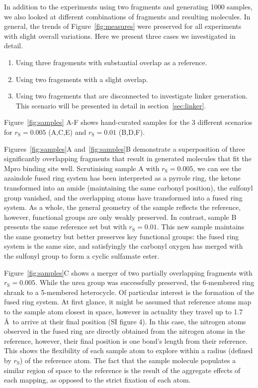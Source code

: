 \documentclass[journal=jacsat,manuscript=article]{achemso}
\begin{document}
In addition to the experiments using two fragments and generating 1000 samples, we also looked at different combinations of fragments and resulting molecules. In general, the trends of Figure~\ref{fig:measures} were preserved for all experiments with slight overall variations. Here we present three cases we investigated in detail.
\begin{enumerate}
    \item Using three fragements with substantial overlap as a reference.
    \item Using two fragements with a slight overlap. 
    \item Using two fragements that are disconnected to investigate linker generation. This scenario will be presented in detail in section~\ref{sec:linker}.
\end{enumerate}

Figure~\ref{fig:samples} A-F shows hand-curated samples for the 3 different scenarios for $r_{\mathrm{S}}=0.005$ (A,C,E) and $r_{\mathrm{S}}=0.01$ (B,D,F).

Figures~\ref{fig:samples}A and~\ref{fig:samples}B demonstrate a superposition of three significantly overlapping fragments that result in generated molecules that fit the Mpro binding site well. Scrutinising sample A with $r_{\mathrm{S}}=0.005$, we can see the azaindole fused ring system has been interpreted as a pyrrole ring, the ketone transformed into an amide (maintaining the same carbonyl position), the sulfonyl group vanished, and the overlapping atoms have transformed into a fused ring system. As a whole, the general geometry of the sample reflects the reference, however, functional groups are only weakly preserved. In contrast, sample B presents the same reference set but with $r_{\mathrm{S}}=0.01$. This new sample maintains the same geometry but better preserves key functional groups: the fused ring system is the same size, and satisfyingly the carbonyl oxygen has merged with the sulfonyl group to form a cyclic sulfamate ester.


Figure~\ref{fig:samples}C shows a merger of two partially overlapping fragments with $r_{\mathrm{S}}=0.005$. While the urea group was successfully preserved, the 6-membered ring shrank to a 5-membered heterocycle. Of particular interest is the formation of the fused ring system. At first glance, it might be assumed that reference atoms map to the sample atom closest in space, however in actuality they travel up to 1.7 \AA~to arrive at their final position (SI figure 4). In this case, the nitrogen atoms observed in the fused ring are directly obtained from the nitrogen atoms in the reference, however, their final position is one bond’s length from their reference. This shows the flexibility of each sample atom to explore within a radius (defined by $r_{\mathrm{S}}$) of the reference atom. The fact that the sample molecule populates a similar region of space to the reference is the result of the aggregate effects of each mapping, as opposed to the strict fixation of each atom. 
\end{document}
